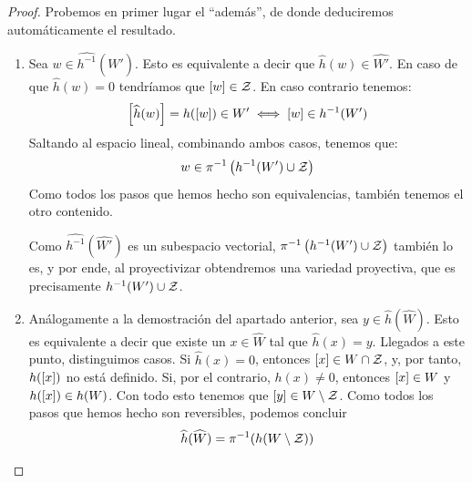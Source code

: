 \begin{proof}
	Probemos en primer lugar el ``además'', de donde deduciremos automáticamente el resultado.
	\begin{enumerate}
		\item[\ti{2.}] Sea $w\in \widehat{h^{-1}}(\widehat{W'})$. Esto es equivalente a decir que $\widehat{h}(w)\in\widehat{W'}$. En caso de que $\widehat{h}(w)=0$ tendríamos que $\left [ w \right ]\in\mathcal{Z}$. En caso contrario tenemos:
		\[\left [ \widehat{h}(w) \right ]=h(\left [ w \right ])\in W'\iff\left [ w \right ]\in h^{-1}(W')\]
		Saltando al espacio lineal, combinando ambos casos, tenemos que:
		\[w\in\pi^{-1}\left(h^{-1}(W')\cup\mathcal{Z}\right)\]
		Como todos los pasos que hemos hecho son equivalencias, también tenemos el otro contenido.
		
		Como $\widehat{h^{-1}}(\widehat{W'})$ es un subespacio vectorial, $\pi^{-1}\left(h^{-1}(W')\cup\mathcal{Z}\right)$ también lo es, y por ende, al proyectivizar obtendremos una variedad proyectiva, que es precisamente $h^{-1}(W')\cup\mathcal{Z}$.
		\item[\ti{1.}] Análogamente a la demostración del apartado anterior, sea $y\in\widehat{h}(\widehat{W})$. Esto es equivalente a decir que existe un $x\in\widehat{W}$ tal que $\widehat{h}(x)=y$. Llegados a este punto, distinguimos casos. Si $\widehat{h}(x)=0$, entonces $\left [ x \right ]\in W\cap\mathcal{Z}$, y, por tanto, $h(\left [ x \right ])$ no está definido. Si, por el contrario, $h(x)\not=0$, entonces $\left [ x \right ]\in W$ y $h(\left [ x \right ])\in h(W)$. Con todo esto tenemos que $\left [ y \right ]\in W\setminus\mathcal{Z}$. Como todos los pasos que hemos hecho son reversibles, podemos concluir
		\begin{equation*}
			\widehat{h}(\widehat{W})=\pi^{-1}(h(W\setminus\mathcal{Z}))\qedhere
		\end{equation*}
	\end{enumerate}
\end{proof}

